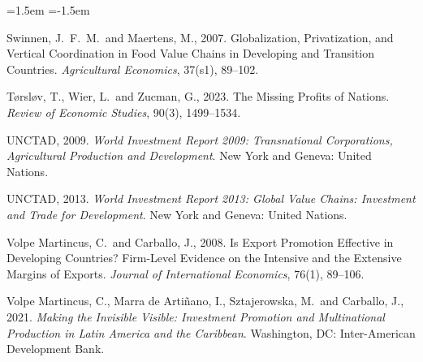 \begin{list}{}{\leftmargin=1.5em \itemindent=-1.5em \itemsep=2pt \topsep=4pt}
\item Swinnen, J.\ F.\ M.\ and Maertens, M., 2007. Globalization, Privatization, and Vertical
Coordination in Food Value Chains in Developing and Transition Countries. \emph{Agricultural
Economics}, 37(s1), 89--102.
\item T{\o}rsl{\o}v, T., Wier, L.\ and Zucman, G., 2023. The Missing Profits of Nations.
\emph{Review of Economic Studies}, 90(3), 1499--1534.
\item UNCTAD, 2009. \emph{World Investment Report 2009: Transnational Corporations, Agricultural
Production and Development}. New York and Geneva: United Nations.
\item UNCTAD, 2013. \emph{World Investment Report 2013: Global Value Chains: Investment and Trade for
Development}. New York and Geneva: United Nations.
\item Volpe Martincus, C.\ and Carballo, J., 2008. Is Export Promotion Effective in Developing
Countries? Firm-Level Evidence on the Intensive and the Extensive Margins of Exports.
\emph{Journal of International Economics}, 76(1), 89--106.
\item Volpe Martincus, C., Marra de Arti\~nano, I., Sztajerowska, M.\ and Carballo, J., 2021.
\emph{Making the Invisible Visible: Investment Promotion and Multinational Production in Latin
America and the Caribbean}. Washington, DC: Inter-American Development Bank.
\end{list}
